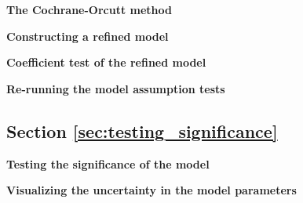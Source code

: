 \begin{exercise}
\label{ex:cochrane_orcutt}

\textbf{The Cochrane-Orcutt method}






\end{exercise}

\begin{exercise}
\label{ex:Leave_out_independent}

\textbf{Constructing a refined model}



\end{exercise}

\begin{exercise}
\label{ex:t_test}

\textbf{Coefficient test of the refined model}



\end{exercise}

\begin{exercise}
\label{ex:Re_running_the_model_assumption_tests}

\textbf{Re-running the model assumption tests}



\end{exercise}

\subsection{Section \ref{sec:testing_significance}}

\begin{exercise}
\label{ex:f_test}

\textbf{Testing the significance of the model}



\end{exercise}

\begin{exercise}
\label{ex:confidence_bounds}

\textbf{Visualizing the uncertainty in the model parameters}






\end{exercise}

